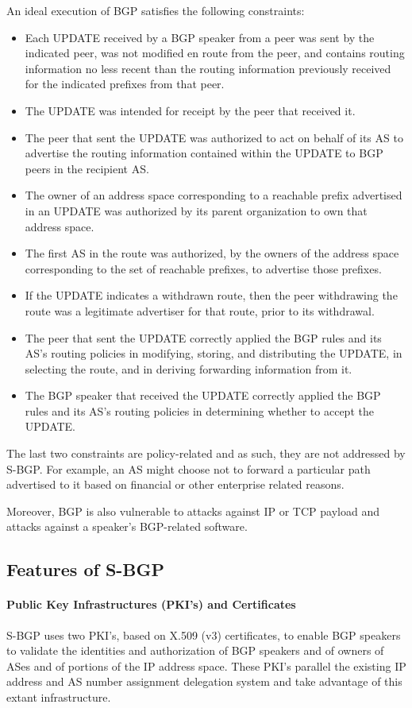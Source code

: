\documentclass[12pt]{article}
\begin{document}
An ideal execution of BGP satisfies the following constraints:
\begin{itemize}
\item Each UPDATE received by a BGP speaker from a peer was
sent by the indicated peer, was not modified en route from
the peer, and contains routing information no less recent
than the routing information previously received for the
indicated prefixes from that peer.
\item The UPDATE was intended for receipt by the peer that
received it.
\item The peer that sent the UPDATE was authorized to act on
behalf of its AS to advertise the routing information contained within the UPDATE to BGP peers in the recipient
AS.
\item The owner of an address space corresponding to a reachable prefix advertised in an UPDATE was authorized by
its parent organization to own that address space.
\item The first AS in the route was authorized, by the owners
of the address space corresponding to the set of reachable
prefixes, to advertise those prefixes.
\item If the UPDATE indicates a withdrawn route, then the peer
withdrawing the route was a legitimate advertiser for that
route, prior to its withdrawal.
\item The peer that sent the UPDATE correctly applied the BGP
rules and its AS's routing policies in modifying, storing,
and distributing the UPDATE, in selecting the route, and
in deriving forwarding information from it.
\item The BGP speaker that received the UPDATE correctly applied the BGP rules and its AS's routing policies in determining whether to accept the UPDATE.
\end{itemize}

The last two constraints are policy-related and as such, they are not addressed by S-BGP. For example, an AS might choose not to forward a particular path advertised to it based on financial or other enterprise related reasons. 

Moreover, BGP is also vulnerable to attacks against IP or TCP payload and attacks against a speaker's BGP-related software.


\subsection{Features of S-BGP}
\paragraph*{Public Key Infrastructures (PKI’s) and Certificates}
S-BGP uses two PKI’s, based on X.509 (v3) certificates, to
enable BGP speakers to validate the identities and authorization
of BGP speakers and of owners of ASes and of portions of the
IP address space. These PKI’s parallel the existing IP address
and AS number assignment delegation system and take advantage of this extant infrastructure.
\end{document}

